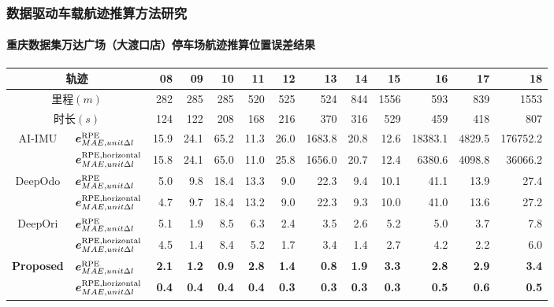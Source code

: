 \begin{frame} 
 	\frametitle{数据驱动车载航迹推算方法研究}
 	\framesubtitle{重庆数据集万达广场（大渡口店）停车场航迹推算位置误差结果}
    {\footnotesize
    \setlength{\tabcolsep}{2pt}
		\begin{tabular*}{\linewidth}{@{\extracolsep{\fill}}clrrrrrrrrrrr}
			\toprule
			\multicolumn{2}{c}{轨迹} & 08 & 09 & 10 & 11 & 12 & 13 & 14 & 15 & 16 & 17 & 18 \\
			\midrule
			\multicolumn{2}{c}{里程$\left(\unit{m}\right)$} & 282  & 285  & 285  & 520  & 525  & 524  & 844  & 1556 & 593   & 839  & 1553   \\
			\multicolumn{2}{c}{时长$\left(\unit{s}\right)$} & 124  & 122  & 208  & 168  & 216  & 370  & 316  & 529  & 459   & 418  & 807    \\
			\multirow{2}{*}{AI-IMU} & $\vb*{e}^{\mathrm{RPE}}_{MAE,unit \Delta l}$ & 15.9 & 24.1 & 65.2 & 11.3 & 26.0 & 1683.8 & 20.8 & 12.6 & 18383.1 & 4829.5 & 176752.2 \\
			& $\vb*{e}^{\mathrm{RPE,horizontal}}_{MAE,unit \Delta l}$ & 15.8 & 24.1 & 65.0 & 11.0 & 25.8 & 1656.0 & 20.7 & 12.4 & 6380.6 & 4098.8 & 36066.2 \\
			\multirow{2}{*}{DeepOdo} & $\vb*{e}^{\mathrm{RPE}}_{MAE,unit \Delta l}$ & 5.0 & 9.8 & 18.4 & 13.3 & 9.0 & 22.3 & 9.4 & 10.1 & 41.1 & 13.9 & 27.4 \\
			& $\vb*{e}^{\mathrm{RPE,horizontal}}_{MAE,unit \Delta l}$ & 4.7 & 9.7 & 18.4 & 13.2 & 9.0 & 22.3 & 9.3 & 10.0 & 41.0 & 13.6 & 27.2 \\
			\multirow{2}{*}{DeepOri} & $\vb*{e}^{\mathrm{RPE}}_{MAE,unit \Delta l}$ & 5.1 & 1.9 & 8.5 & 6.3 & 2.4 & 3.5 & 2.6 & 5.2 & 5.0 & 3.7 & 7.8 \\
			& $\vb*{e}^{\mathrm{RPE,horizontal}}_{MAE,unit \Delta l}$ & 4.5 & 1.4 & 8.4 & 5.2 & 1.7 & 3.4 & 1.4 & 2.7 & 4.2 & 2.2 & 6.0 \\
			\multirow{2}{*}{\textbf{Proposed}} & $\vb*{e}^{\mathrm{RPE}}_{MAE,unit \Delta l}$ & \textbf{2.1} & \textbf{1.2} & \textbf{0.9} & \textbf{2.8} & \textbf{1.4} & \textbf{0.8} & \textbf{1.9} & \textbf{3.3} & \textbf{2.8} & \textbf{2.9} & \textbf{3.4} \\
			& $\vb*{e}^{\mathrm{RPE,horizontal}}_{MAE,unit \Delta l}$ & \textbf{0.4} & \textbf{0.4} & \textbf{0.4} & \textbf{0.4} & \textbf{0.3} & \textbf{0.3} & \textbf{0.3} & \textbf{0.3} & \textbf{0.5} & \textbf{0.6} & \textbf{0.5} \\
			\bottomrule 
		\end{tabular*}
	}	
\end{frame}

